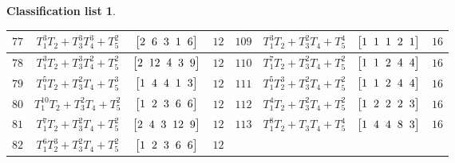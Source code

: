 \documentclass[10pt,a4paper]{amsart}
\theoremstyle{definition}
\newtheorem{class-list}[thm]{Classification list}
\numberwithin{equation}{section}
\begin{document}
\begin{class-list}
\begin{table}[t!]
\begin{tabu}{c|c|c|c||c|c|c|c}
\\
\hline
${77}$&${T_{1}^{3}T_{2}+T_{3}^{3}T_{4}^{3}+T_{5}^{2}}$
&$\arraycolsep=1mm\begin{bmatrix}{2} & {6} & {3} & {1} & {6}\end{bmatrix}$&${12}$
&${109}$&${T_{1}^{3}T_{2}+T_{3}^{2}T_{4}+T_{5}^{4}}$
&$\arraycolsep=1mm\begin{bmatrix}{1} & {1} & {1} & {2} & {1}\end{bmatrix}$&${16}$
\\
\hline
${78}$&${T_{1}^{3}T_{2}+T_{3}^{3}T_{4}^{2}+T_{5}^{2}}$
&$\arraycolsep=1mm\begin{bmatrix}{2} & {12} & {4} & {3} & {9}\end{bmatrix}$&${12}$
&${110}$&${T_{1}^{7}T_{2}+T_{3}^{2}T_{4}+T_{5}^{2}}$
&$\arraycolsep=1mm\begin{bmatrix}{1} & {1} & {2} & {4} & {4}\end{bmatrix}$&${16}$
\\
\hline
${79}$&${T_{1}^{5}T_{2}+T_{3}^{2}T_{4}+T_{5}^{3}}$
&$\arraycolsep=1mm\begin{bmatrix}{1} & {4} & {4} & {1} & {3}\end{bmatrix}$&${12}$
&${111}$&${T_{1}^{5}T_{2}^{3}+T_{3}^{2}T_{4}+T_{5}^{2}}$
&$\arraycolsep=1mm\begin{bmatrix}{1} & {1} & {2} & {4} & {4}\end{bmatrix}$&${16}$
\\
\hline
${80}$&${T_{1}^{10}T_{2}+T_{3}^{2}T_{4}+T_{5}^{2}}$
&$\arraycolsep=1mm\begin{bmatrix}{1} & {2} & {3} & {6} & {6}\end{bmatrix}$&${12}$
&${112}$&${T_{1}^{4}T_{2}+T_{3}^{2}T_{4}+T_{5}^{2}}$
&$\arraycolsep=1mm\begin{bmatrix}{1} & {2} & {2} & {2} & {3}\end{bmatrix}$&${16}$
\\
\hline
${81}$&${T_{1}^{7}T_{2}+T_{3}^{2}T_{4}+T_{5}^{2}}$
&$\arraycolsep=1mm\begin{bmatrix}{2} & {4} & {3} & {12} & {9}\end{bmatrix}$&${12}$
&${113}$&${T_{1}^{8}T_{2}+T_{3}T_{4}+T_{5}^{4}}$
&$\arraycolsep=1mm\begin{bmatrix}{1} & {4} & {4} & {8} & {3}\end{bmatrix}$&${16}$
\\
\hline
${82}$&${T_{1}^{6}T_{2}^{3}+T_{3}^{2}T_{4}+T_{5}^{2}}$
&$\arraycolsep=1mm\begin{bmatrix}{1} & {2} & {3} & {6} & {6}\end{bmatrix}$&${12}$

\end{tabu}
\end{table}
\end{class-list}
\end{document}
